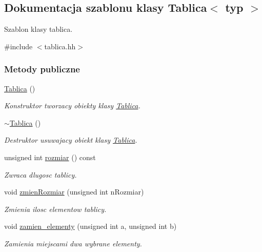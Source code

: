 \hypertarget{class_tablica}{\subsection{Dokumentacja szablonu klasy Tablica$<$ typ $>$}
\label{class_tablica}
}


Szablon klasy tablica.  




{\ttfamily \#include $<$tablica.\-hh$>$}

\subsubsection*{Metody publiczne}
\begin{DoxyCompactItemize}
\item 
\hyperlink{class_tablica_a7498fcc788ff50e277ef32d85bccf922}{Tablica} ()
\begin{DoxyCompactList}\small\item\em Konstruktor tworzacy obiekty klasy \hyperlink{class_tablica}{Tablica}. \end{DoxyCompactList}\item 
\hyperlink{class_tablica_a7f77a03d8a57bd834c75aab5d86714b6}{$\sim$\-Tablica} ()
\begin{DoxyCompactList}\small\item\em Destruktor usuwajacy obiekt klasy \hyperlink{class_tablica}{Tablica}. \end{DoxyCompactList}\item 
unsigned int \hyperlink{class_tablica_af593a1625878839c9c5192d5f9e5c7f8}{rozmiar} () const 
\begin{DoxyCompactList}\small\item\em Zwraca dlugosc tablicy. \end{DoxyCompactList}\item 
void \hyperlink{class_tablica_a575b90afd3acb12c5f89f61e0e86cca1}{zmien\-Rozmiar} (unsigned int n\-Rozmiar)
\begin{DoxyCompactList}\small\item\em Zmienia ilosc elementow tablicy. \end{DoxyCompactList}\item 
void \hyperlink{class_tablica_a8e55f9ec78349e311411b3aa06df3b05}{zamien\-\_\-elementy} (unsigned int a, unsigned int b)
\begin{DoxyCompactList}\small\item\em Zamienia miejscami dwa wybrane elementy. \end{DoxyCompactList}\item 

\end{DoxyCompactItemize}
